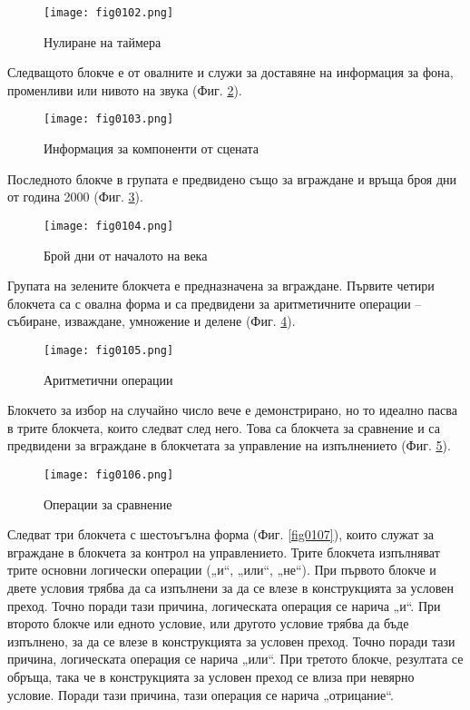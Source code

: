 \begin{figure}[H]
  \centering
  \texttt{[image: fig0102.png]}
  \caption{Нулиране на таймера}
\label{fig0102}
\end{figure}

Следващото блокче е от овалните и служи за доставяне на информация за фона, променливи или нивото на звука (Фиг. \ref{fig0103}).

\begin{figure}[H]
  \centering
  \texttt{[image: fig0103.png]}
  \caption{Информация за компоненти от сцената}
\label{fig0103}
\end{figure}

Последното блокче в групата е предвидено също за вграждане и връща броя дни от година 2000 (Фиг. \ref{fig0104}).

\begin{figure}[H]
  \centering
  \texttt{[image: fig0104.png]}
  \caption{Брой дни от началото на века}
\label{fig0104}
\end{figure}

Групата на зелените блокчета е предназначена за вграждане. Първите четири блокчета са с овална форма и са предвидени за аритметичните операции – събиране, изваждане, умножение и делене (Фиг. \ref{fig0105}).

\begin{figure}[H]
  \centering
  \texttt{[image: fig0105.png]}
  \caption{Аритметични операции}
\label{fig0105}
\end{figure}

Блокчето за избор на случайно число вече е демонстрирано, но то идеално пасва в трите блокчета, които следват след него. Това са блокчета за сравнение и са предвидени за вграждане в блокчетата за управление на изпълнението (Фиг. \ref{fig0106}).

\begin{figure}[H]
  \centering
  \texttt{[image: fig0106.png]}
  \caption{Операции за сравнение}
\label{fig0106}
\end{figure}

Следват три блокчета с шестоъгълна форма (Фиг. \ref{fig0107}), които служат за вграждане в блокчета за контрол на управлението. Трите блокчета изпълняват трите основни логически операции („и“, „или“, „не“). При първото блокче и двете условия трябва да са изпълнени за да се влезе в конструкцията за условен преход. Точно поради тази причина, логическата операция се нарича „и“. При второто блокче или едното условие, или другото условие трябва да бъде изпълнено, за да се влезе в конструкцията за условен преход. Точно поради тази причина, логическата операция се нарича „или“. При третото блокче, резултата се обръща, така че в конструкцията за условен преход се влиза при невярно условие. Поради тази причина, тази операция се нарича „отрицание“.


